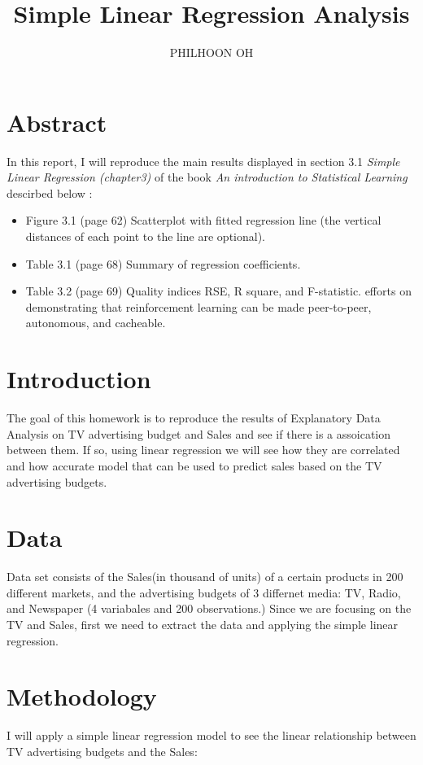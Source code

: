\documentclass{article}
\title{Simple Linear Regression Analysis}
\author{PHILHOON OH}
\begin{document}

\maketitle

\section{Abstract}
In this report, I will reproduce the main results displayed in section 3.1 \emph{Simple Linear Regression (chapter3)} of the book \emph{An introduction to Statistical Learning} descirbed below : 
\begin{itemize}
\item Figure 3.1 (page 62) Scatterplot with fitted regression line (the vertical distances of each point to the line are optional).  
\item Table 3.1 (page 68) Summary of regression coefficients.  
\item Table 3.2 (page 69) Quality indices RSE, R square, and F-statistic. efforts on demonstrating that reinforcement learning can be made peer-to-peer, autonomous, and cacheable.
\end{itemize}


\section{Introduction}
The goal of this homework is to reproduce the results of Explanatory Data Analysis on TV advertising budget and Sales and see if there is a assoication between them. If so, using linear regression we will see how they are correlated and how accurate model that can be used to predict sales based on the TV advertising budgets.


\section{Data}
Data set consists of the Sales(in thousand of units) of a certain products in 200 different markets, and the advertising budgets of 3 differnet media: TV, Radio, and Newspaper (4 variabales and 200 observations.) Since we are focusing on the TV and Sales, first we need to extract the data and applying the simple linear regression.


\section{Methodology}
I will apply a simple linear regression model to see the linear relationship between TV advertising budgets and the Sales:
\end{document}
